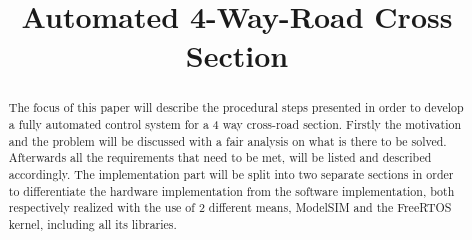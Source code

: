 \documentclass[conference]{IEEEtran}
\begin{document}
\title{Automated 4-Way-Road Cross Section}


\author{
\and
{}
\and
{}
\and
{}

}

\maketitle

\begin{abstract}
The focus of this paper will describe the procedural steps presented in order to develop a fully automated control system for a 4 way cross-road section. Firstly the motivation and the problem will be discussed with a fair analysis on what is there to be solved. Afterwards all the requirements that need to be met, will be listed and described accordingly. The implementation part will be split into two separate sections in order to differentiate the hardware implementation from the software implementation, both respectively realized with the use of 2 different means, ModelSIM and the FreeRTOS kernel, including all its libraries.
\end{abstract}
\end{document}
